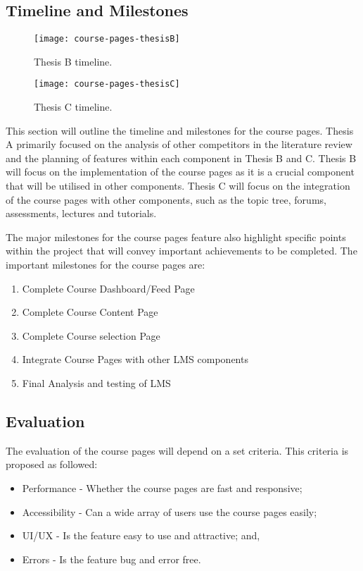 \subsection{Timeline and Milestones}
\begin{figure}[h]
    \centering
    \texttt{[image: course-pages-thesisB]}
    \caption{Thesis B timeline.}
\end{figure}

\begin{figure}[h]
    \centering
    \texttt{[image: course-pages-thesisC]}
    \caption{Thesis C timeline.}
\end{figure}
This section will outline the timeline and milestones for the course pages.
Thesis A primarily focused on the analysis of other competitors in the literature review and the planning of features within each component in Thesis B and C.
Thesis B will focus on the implementation of the course pages as it is a crucial component that will be utilised in other components.
Thesis C will focus on the integration of the course pages with other components, such as the topic tree, forums, assessments, lectures and tutorials.

The major milestones for the course pages feature also highlight specific points within the project that will convey important achievements to be completed.
The important milestones for the course pages are:
\begin{enumerate}
    \item Complete Course Dashboard/Feed Page
    \item Complete Course Content Page
    \item Complete Course selection Page
    \item Integrate Course Pages with other LMS components
    \item Final Analysis and testing of LMS
\end{enumerate}

\subsection{Evaluation}
The evaluation of the course pages will depend on a set criteria.
This criteria is proposed as followed:
\begin{itemize}
    \item Performance - Whether the course pages are fast and responsive;
    \item Accessibility - Can a wide array of users use the course pages easily;
    \item UI/UX - Is the feature easy to use and attractive; and,
    \item Errors - Is the feature bug and error free.
\end{itemize}

